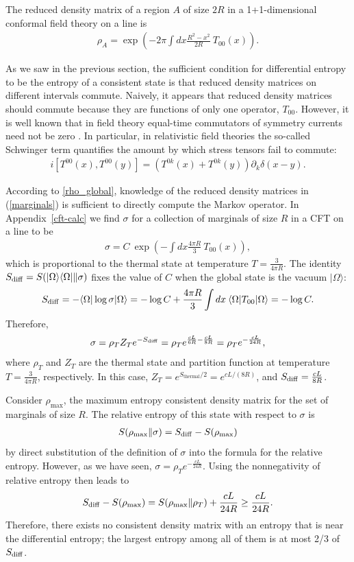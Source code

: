 \documentclass[12pt]{article}
\newcommand{\la}{\langle}
\newcommand{\ra}{\rangle}
\newcommand{\rb}{\right)}
\newcommand{\lb}{\left(}
\def\bea{\begin{eqnarray}}
\def\eea{\end{eqnarray}}
\def\sdiff{S_{\rm diff}}
\newcommand{\appref}[1]{Appendix~\ref{#1}}
\begin{document}
The reduced density matrix of a region $A$ of size $2R$ in a 1+1-dimensional conformal field theory on a line is \cite{casini2011towards}
\bea\label{marginals}
\rho_A=\exp\lb -2\pi\int dx \frac{R^2-x^2}{2R}\:T_{00}(x)\rb.
\eea

As we saw in the previous section, the sufficient condition for differential entropy to be the entropy of a consistent state is that reduced density matrices on different intervals commute. Naively, it appears that reduced density matrices should commute because they are functions of only one operator, $T_{00}$. However, it is well known that in field theory equal-time commutators of symmetry currents need not be zero \cite{schwinger1963commutation}. In particular, in relativistic field theories the so-called Schwinger term quantifies the amount by which stress tensors fail to commute:
\bea
i[T^{00}(x),T^{00}(y)]=\lb T^{0k}(x)+T^{0k}(y)\rb \partial_k \delta(x-y).
\eea

According to \eqref{rho_global}, knowledge of the reduced density matrices in (\ref{marginals}) is sufficient to directly compute the Markov operator. In \appref{cft-calc} we find $\sigma$ for a collection of marginals of size $R$ in a CFT on a line to be
\bea
\sigma=C\: \exp\lb-\int dx \frac{4\pi R}{3}\: T_{00}(x)\rb,
\eea
which is proportional to the thermal state at temperature $T=\frac{3}{4\pi R}$.
The identity $\sdiff=S(|\Omega\ra\la\Omega|\|\sigma)$ fixes the value of $C$ when the global state is the vacuum $|\Omega\ra$:
\bea
\sdiff=-\la\Omega|\log\sigma|\Omega\ra=-\log C+\frac{4\pi R}{3}\int dx\:\la\Omega| T_{00}|\Omega\ra=-\log C.
\eea
Therefore,
\bea
\sigma=\rho_T Z_T e^{-\sdiff}= \rho_T e^{\frac{c L}{6 R}-\frac{c L}{8 R}}=\rho_T e^{-\frac{c L}{24 R}},
\eea
where $\rho_T$ and $Z_T$ are the thermal state and partition function at temperature $T=\frac{3}{4\pi R}$, respectively. In this case, $Z_T=e^{S_{\operatorname{thermal}}/2}=e^{c L/ (8 R)}$, and $\sdiff=\frac{c L}{8 R}$.

Consider $\rho_{\max}$, the maximum entropy consistent density matrix for the set of marginals of size $R$. The relative entropy of this state with respect to $\sigma$ is
\bea
S(\rho_{\max}\|\sigma)=\sdiff-S(\rho_{\max})
\eea
by direct substitution of the definition of $\sigma$ into the formula for the relative entropy.
However, as we have seen, $\sigma=\rho_T e^{-\frac{c L}{24 R}}$. Using the nonnegativity of relative entropy then leads to
\bea
\sdiff-S(\rho_{\max})=S(\rho_{\max}\|\rho_T)+\frac{c L}{24 R}\geq \frac{c L}{24 R}.
\eea
Therefore, there exists no consistent density matrix with an entropy that is near the differential entropy; the largest entropy among all of them is at most 2/3 of $\sdiff$.
\end{document}
